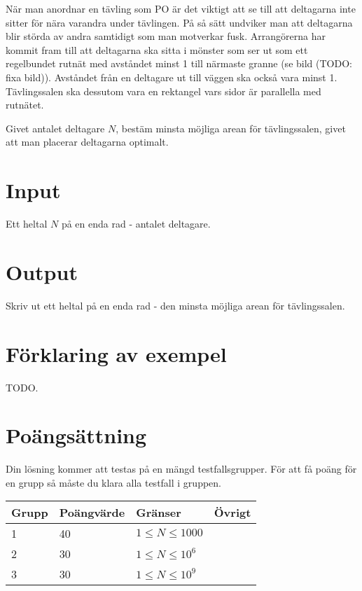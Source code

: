 När man anordnar en tävling som PO är det viktigt att se till att deltagarna
inte sitter för nära varandra under tävlingen. På så sätt undviker man att
deltagarna blir störda av andra samtidigt som man motverkar fusk.
Arrangörerna har kommit fram till att deltagarna ska sitta i mönster som ser ut
som ett regelbundet rutnät med avståndet minst 1 till närmaste granne (se bild (TODO: fixa bild)).
Avståndet från en deltagare ut till väggen ska också vara minst 1.
Tävlingssalen ska dessutom vara en
rektangel vars sidor är parallella med rutnätet.

Givet antalet deltagare $N$, bestäm minsta möjliga arean för tävlingssalen, givet att man placerar
deltagarna optimalt.

\section*{Input}
Ett heltal $N$ på en enda rad - antalet deltagare.

\section*{Output}
Skriv ut ett heltal på en enda rad - den minsta möjliga arean för tävlingssalen.

\section*{Förklaring av exempel}
TODO.

\section*{Poängsättning}
Din lösning kommer att testas på en mängd testfallsgrupper. För att få poäng för en grupp så måste du klara alla testfall i gruppen.

\begin{tabular}{| l | l | l | l |}
\hline
Grupp & Poängvärde & Gränser & Övrigt\\ \hline
1     & 40         & $ 1 \le N \le 1000 $ & \\ \hline
2     & 30         & $ 1 \le N \le 10^6 $ & \\ \hline
3     & 30         & $ 1 \le N \le 10^9 $ & \\ \hline
\end{tabular}
